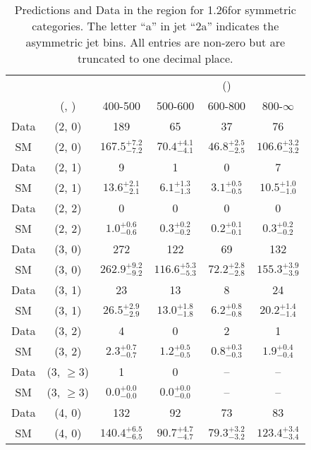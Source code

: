 \begin{table}[h!]
\tiny
\centering
\caption{Predictions and Data in the \gj region for 1.26\ifb for symmetric categories. The letter ``a'' in jet \eg ``2a''  indicates the asymmetric jet bins. All entries are non-zero but are truncated to one decimal place.\label{tab:yieldsallpost_gj_comb_sym}}
\begin{tabular}
{cccccc}
	\hline\hline
&	&	& \multicolumn{4}{c}{\scalht (\gev)}\\ 
	&	 (\njet, \nb) & 400-500 & 500-600 & 600-800 & 800-$\infty$ \\ [0.8ex] 
\hline
	Data & (2, 0) & 189 & 65 & 37 & 76 \\[0.5ex] 
	SM & (2, 0) & $167.5^{+ 7.2 }_{- 7.2 }$ & $70.4^{+ 4.1 }_{- 4.1 }$ & $46.8^{+ 2.5 }_{- 2.5 }$ & $106.6^{+ 3.2 }_{- 3.2 }$ \\[0.5ex] 
	Data & (2, 1) & 9 & 1 & 0 & 7 \\[0.5ex] 
	SM & (2, 1) & $13.6^{+ 2.1 }_{- 2.1 }$ & $6.1^{+ 1.3 }_{- 1.3 }$ & $3.1^{+ 0.5 }_{- 0.5 }$ & $10.5^{+ 1.0 }_{- 1.0 }$ \\[0.5ex] 
	Data & (2, 2) & 0 & 0 & 0 & 0 \\[0.5ex] 
	SM & (2, 2) & $1.0^{+ 0.6 }_{- 0.6 }$ & $0.3^{+ 0.2 }_{- 0.2 }$ & $0.2^{+ 0.1 }_{- 0.1 }$ & $0.3^{+ 0.2 }_{- 0.2 }$ \\[0.5ex] 
	Data & (3, 0) & 272 & 122 & 69 & 132 \\[0.5ex] 
	SM & (3, 0) & $262.9^{+ 9.2 }_{- 9.2 }$ & $116.6^{+ 5.3 }_{- 5.3 }$ & $72.2^{+ 2.8 }_{- 2.8 }$ & $155.3^{+ 3.9 }_{- 3.9 }$ \\[0.5ex] 
	Data & (3, 1) & 23 & 13 & 8 & 24 \\[0.5ex] 
	SM & (3, 1) & $26.5^{+ 2.9 }_{- 2.9 }$ & $13.0^{+ 1.8 }_{- 1.8 }$ & $6.2^{+ 0.8 }_{- 0.8 }$ & $20.2^{+ 1.4 }_{- 1.4 }$ \\[0.5ex] 
	Data & (3, 2) & 4 & 0 & 2 & 1 \\[0.5ex] 
	SM & (3, 2) & $2.3^{+ 0.7 }_{- 0.7 }$ & $1.2^{+ 0.5 }_{- 0.5 }$ & $0.8^{+ 0.3 }_{- 0.3 }$ & $1.9^{+ 0.4 }_{- 0.4 }$ \\[0.5ex] 
	Data & (3, $\ge3$) & 1 & 0 & -- & -- \\[0.5ex] 
	SM & (3, $\ge3$) & $0.0^{+ 0.0 }_{- 0.0 }$ & $0.0^{+ 0.0 }_{- 0.0 }$ & -- & -- \\[0.5ex] 
	Data & (4, 0) & 132 & 92 & 73 & 83 \\[0.5ex] 
	SM & (4, 0) & $140.4^{+ 6.5 }_{- 6.5 }$ & $90.7^{+ 4.7 }_{- 4.7 }$ & $79.3^{+ 3.2 }_{- 3.2 }$ & $123.4^{+ 3.4 }_{- 3.4 }$ \\[0.5ex] 

\end{tabular}
\end{table}
